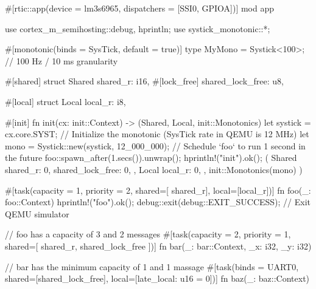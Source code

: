 #[rtic::app(device = lm3s6965, dispatchers = [SSI0, GPIOA])]
mod app {
    use cortex_m_semihosting::{debug, hprintln};
    use systick_monotonic::*;

    #[monotonic(binds = SysTick, default = true)]
    type MyMono = Systick<100>; // 100 Hz / 10 ms granularity

    #[shared]
    struct Shared {
        shared_r: i16,
        #[lock_free]
        shared_lock_free: u8,
    }

    #[local]
    struct Local {
        local_r: i8,
    }

    #[init]
    fn init(cx: init::Context) -> (Shared, Local, init::Monotonics) {
        let systick = cx.core.SYST;
        // Initialize the monotonic (SysTick rate in QEMU is 12 MHz)
        let mono = Systick::new(systick, 12_000_000);
        // Schedule `foo` to run 1 second in the future
        foo::spawn_after(1.secs()).unwrap();
        hprintln!("init").ok();
        (
            Shared {
                shared_r: 0,
                shared_lock_free: 0,
            }, 
            Local {
                local_r: 0,
            }, 
            init::Monotonics(mono)
        )
    }

    #[task(capacity = 1, priority = 2, shared=[ shared_r], local=[local_r])]
    fn foo(_: foo::Context) {
        hprintln!("foo").ok();
        debug::exit(debug::EXIT_SUCCESS); // Exit QEMU simulator
    }

    // foo has a capacity of 3 and 2 messages
    #[task(capacity = 2, priority = 1, shared=[ shared_r, shared_lock_free ])]
    fn bar(_: bar::Context, _x: i32, _y: i32) {
    }

    // bar has the minimum capacity of 1 and 1 massage
    #[task(binds = UART0, shared=[shared_lock_free], local=[late_local: u16 = 0])]
    fn baz(_: baz::Context){
    }
}
